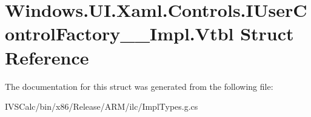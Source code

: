 \hypertarget{struct_windows_1_1_u_i_1_1_xaml_1_1_controls_1_1_i_user_control_factory_____impl_1_1_vtbl}{}\section{Windows.\+U\+I.\+Xaml.\+Controls.\+I\+User\+Control\+Factory\+\_\+\+\_\+\+Impl.\+Vtbl Struct Reference}
\label{struct_windows_1_1_u_i_1_1_xaml_1_1_controls_1_1_i_user_control_factory_____impl_1_1_vtbl}


The documentation for this struct was generated from the following file\+:\begin{DoxyCompactItemize}
\item 
I\+V\+S\+Calc/bin/x86/\+Release/\+A\+R\+M/ilc/Impl\+Types.\+g.\+cs\end{DoxyCompactItemize}
